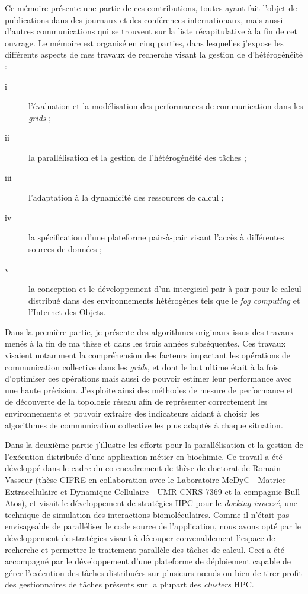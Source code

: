 Ce mémoire présente une partie de ces contributions, toutes ayant fait l'objet de publications dans des journaux et des conférences internationaux, mais aussi d'autres communications qui se trouvent sur la liste récapitulative à la fin de cet ouvrage. Le mémoire est organisé en cinq parties, dans lesquelles j'expose les différents aspects de mes travaux de recherche visant la gestion de d'hétérogénéité :
\begin{description}
	\item[i] l'évaluation et la modélisation des performances de communication dans les \textit{grids} ; 
	\item [ii] la parallélisation et la gestion de l'hétérogénéité des tâches ;
	\item [iii] l'adaptation à la dynamicité des ressources de calcul ;
	\item [iv] la spécification d'une plateforme pair-à-pair visant l'accès à différentes sources de données ;
	\item [v] la conception et le développement d'un intergiciel pair-à-pair pour le calcul distribué dans des environnements hétérogènes tels que le \textit{fog computing} et l'Internet des Objets.
\end{description}


Dans la première partie, je présente des algorithmes originaux issus des travaux menés à la fin de ma thèse et dans les trois années subséquentes. Ces travaux visaient notamment la compréhension des facteurs impactant les opérations de communication collective dans les \textit{grids}, et dont le but ultime était à la fois d'optimiser ces opérations mais aussi de pouvoir estimer leur performance avec une haute précision.  J'exploite ainsi des méthodes de mesure de performance et de découverte de la topologie réseau afin de représenter correctement les environnements et pouvoir extraire des indicateurs aidant à choisir les algorithmes de communication collective les plus adaptés à chaque situation. 

Dans la deuxième partie j'illustre les efforts pour la parallélisation et la gestion de l'exécution distribuée d'une application métier en biochimie. Ce travail a été développé dans le cadre du co-encadrement de thèse de doctorat de Romain Vasseur (thèse CIFRE en collaboration avec le Laboratoire MeDyC - Matrice Extracellulaire et Dynamique Cellulaire - UMR CNRS 7369 et la compagnie Bull-Atos), et visait le développement de stratégies HPC pour le \textit{docking inversé}, une technique de simulation des interactions biomoléculaires. Comme il n'était pas envisageable de paralléliser le code source de l'application, nous avons opté par le développement de stratégies visant à découper convenablement l'espace de recherche et permettre le traitement parallèle des tâches de calcul. Ceci a été accompagné par le développement d'une plateforme de déploiement capable de gérer l'exécution des tâches distribuées sur plusieurs n{\oe}uds ou bien de tirer profit des gestionnaires de tâches présents sur la plupart des \textit{clusters} HPC. 

